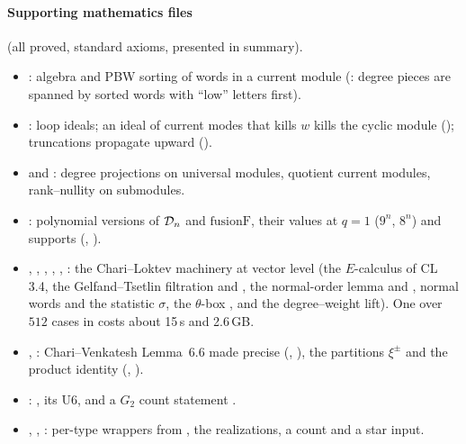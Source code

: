\paragraph{Supporting mathematics files} (all proved, standard axioms, presented in summary).
\begin{itemize}
\item {}:  algebra and PBW sorting of words in a current module
  (: degree pieces are spanned by sorted words with ``low'' letters first).
\item {}: loop ideals; an ideal of current modes that kills $w$ kills the cyclic module
  (); truncations propagate upward ().
\item {} and : degree projections on universal modules,
  quotient current modules, rank--nullity on submodules.
\item {}: polynomial versions of $\mathcal D_n$ and $\mathrm{fusionF}$, their values at $q=1$
  ($9^n$, $8^n$) and supports (, ).
\item {}, , ,
  , , : the
  Chari--Loktev machinery at vector level (the $E$-calculus of CL 3.4, the Gelfand--Tsetlin filtration and ,
  the normal-order lemma and , normal words and the statistic $\sigma$, the $\theta$-box , and the
  degree--weight lift). One  over $512$ cases in  costs about 15\,s and 2.6\,GB.
\item {}, : Chari--Venkatesh Lemma~6.6 made precise
  (, ), the partitions $\xi^\pm$ and the product identity (, ).
\item {}: , its U6, and a $G_2$ count statement .
\item {}, , : per-type
  wrappers from , the realizations, a count and a star input.
\end{itemize}

